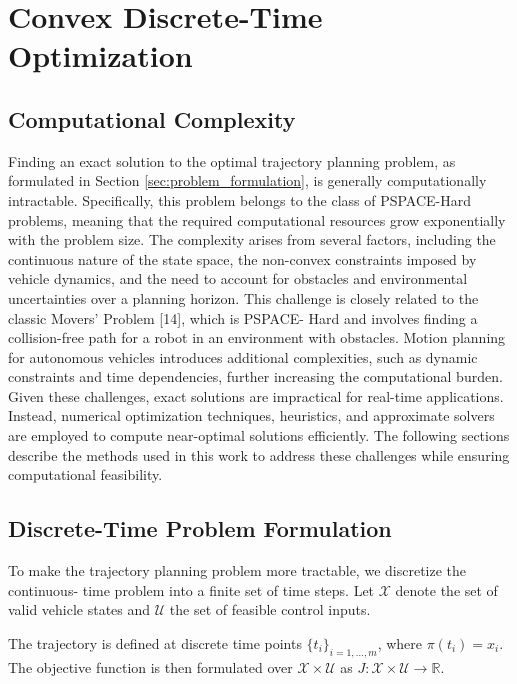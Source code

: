 \section{Convex Discrete-Time Optimization} \label{sec:convex_discrete_time_optimization}

\subsection{Computational Complexity} \label{subsec:complexity}

Finding an exact solution to the optimal trajectory planning problem, as formulated in Section \ref{sec:problem_formulation}, is generally
computationally intractable.
Specifically, this problem belongs to the class of PSPACE-Hard problems, meaning that the required computational resources grow exponentially with
the problem size.
The complexity arises from several factors, including the continuous nature of the state space, the non-convex constraints imposed by vehicle
dynamics, and the need to account for obstacles and environmental uncertainties over a planning horizon.
This challenge is closely related to the classic Movers' Problem [14], which is PSPACE- Hard and involves finding a collision-free path for a robot
in an environment with obstacles.
Motion planning for autonomous vehicles introduces additional complexities, such as dynamic constraints and time dependencies, further increasing the
computational burden.
Given these challenges, exact solutions are impractical for real-time applications.
Instead, numerical optimization techniques, heuristics, and approximate solvers are employed to compute near-optimal solutions efficiently.
The following sections describe the methods used in this work to address these challenges while ensuring computational feasibility.

\subsection{Discrete-Time Problem Formulation}

To make the trajectory planning problem more tractable, we discretize the continuous- time problem into a finite set of time steps.
Let $\mathcal{X}$ denote the set of valid vehicle states and $\mathcal{U}$ the set of feasible control inputs.

The trajectory is defined at discrete time points $\{t_i\}_{i=1,\dots,m}$, where $\pi(t_i) = x_i$.
The objective function is then formulated over $\mathcal{X} \times \mathcal{U}$ as $J: \mathcal{X} \times \mathcal{U} \to \mathbb{R}$.

